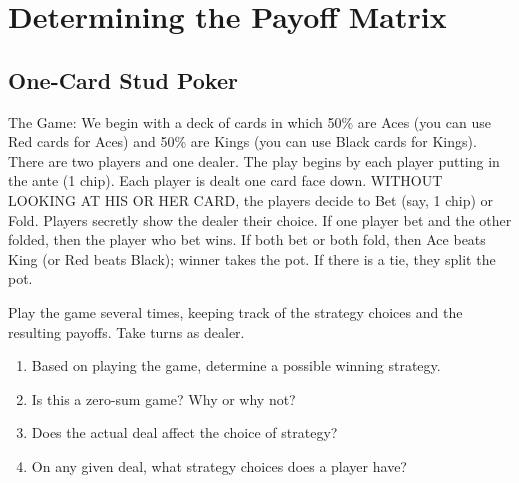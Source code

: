 
\section{Determining the Payoff Matrix}



\vspace{.1in}
\subsection{One-Card Stud Poker}

The Game: We begin with a deck of cards in which 50\% are Aces (you can use Red cards for Aces) and 50\% are Kings (you can use Black cards for Kings). There are two players and one dealer. The play begins by each player putting in the ante (1 chip). Each player is dealt one card face down. WITHOUT LOOKING AT HIS OR HER CARD, the players decide to Bet (say, 1 chip) or Fold. Players secretly show the dealer their choice. If one player bet and the other folded, then the player who bet wins. If both bet or both fold, then Ace beats King (or Red beats Black); winner takes the pot. If there is a tie, they split the pot.

\vspace{.1in}
Play the game several times, keeping track of the strategy choices and the resulting payoffs. Take turns as dealer. 

\vspace{.1in}

\begin{enumerate}

\item Based on playing the game, determine a possible winning strategy.
\vspace{.1in}

\item Is this a zero-sum game? Why or why not?
\vspace{.1in}

\item Does the actual deal affect the choice of strategy?
\vspace{.1in}

\item On any given deal, what strategy choices does a player have?
\vspace{.1in}

\end{enumerate}

